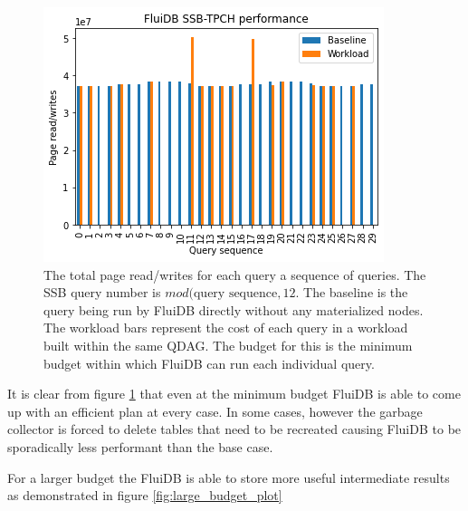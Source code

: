 \begin{figure}[p]
\centering
\includegraphics[width=.9\linewidth]{./imgs/2021-12-03_18-36-27_screenshot.png}
\caption{\label{fig:min_budget_plot}
  The total page read/writes for each query a sequence of queries. The
  SSB query number is \(mod(\text{query sequence},12\). The baseline
  is the query being run by FluiDB directly without any materialized
  nodes. The workload bars represent the cost of each query in a
  workload built within the same QDAG. The budget for this is the
  minimum budget within which FluiDB can run each individual query.}
\end{figure}

It is clear from figure \ref{fig:min_budget_plot} that even at the minimum budget
FluiDB is able to come up with an efficient plan at every case. In
some cases, however the garbage collector is forced to delete tables
that need to be recreated causing FluiDB to be sporadically less
performant than the base case.

For a larger budget the FluiDB is able to store more useful
intermediate results as demonstrated in figure \ref{fig:large_budget_plot}

